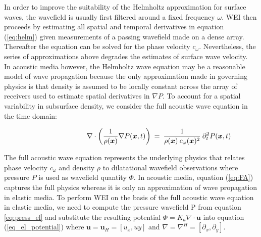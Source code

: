 \documentclass[]{article}
\begin{document}
	In order to improve the suitability of the Helmholtz approximation for surface waves, the wavefield is usually first filtered around a fixed frequency $\omega$. WEI then proceeds by estimating all spatial and temporal derivatives in equation (\ref{eq:helm}) given measurements of a passing wavefield made on a dense array. Thereafter the equation can be solved for the phase velocity $c_{\omega}$. Nevertheless, the series of approximations above degrades the estimates of surface wave velocity.\\ 
	
	In acoustic media however, the Helmholtz wave equation may be a reasonable model of wave propagation because the only approximation made in governing physics is that density is assumed to be locally constant across the array of receivers used to estimate spatial derivatives in $\nabla P$. To account for a spatial variability in subsurface density, we consider the full acoustic wave equation in the time domain:
	
	\begin{align}\label{eq:FA}
		\shoveright \shoveright \shoveright \shoveright \shoveright \shoveright \shoveright \shoveright %
		\; \; \; \nabla \cdot \bigg( \frac{1}{\rho(\bm{x})} \nabla P(\bm{x},t) \bigg) &\: = \: \frac{1}{\rho(\bm{x}) \: c_{\omega}(\bm{x})^{2}} \: \partial_{t}^{2} P(\bm{x},t)
	\end{align}

	The full acoustic wave equation represents the underlying physics that relates phase velocity $c_{\omega}$ and density $\rho$ to dilatational wavefield observations where pressure $P$ is used as wavefield quantity $\Phi$. In acoustic media, equation (\ref{eq:FA}) captures the full physics whereas it is only an approximation of wave propagation in elastic media. To perform WEI on the basis of the full acoustic wave equation in elastic media, we need to compute the pressure wavefield P from equation \eqref{eq:press_el} and substitute the resulting potential $\Phi = K_{a} \nabla \cdot \bm{u}$ into equation (\ref{eq_el_potential}) where $\bm{u} = \bm{u}_{H} = [u_{x}, u{y}]$ and $\nabla = \nabla^{H} = [\partial_{x}, \partial_{y}]$.\\
	
\end{document}
